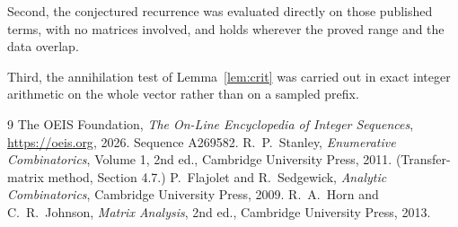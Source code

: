 \documentclass[11pt,a4paper]{article}
\theoremstyle{plain}
\theoremstyle{definition}
\begin{document}
Second, the conjectured recurrence was evaluated directly on those published terms, with no
matrices involved, and holds wherever the proved range and the data overlap.

Third, the annihilation test of Lemma~\ref{lem:crit} was carried out in exact integer
arithmetic on the whole vector rather than on a sampled prefix.

\begin{thebibliography}{9}
 The OEIS Foundation, \emph{The On-Line Encyclopedia of Integer
Sequences}, \url{https://oeis.org}, 2026. Sequence A269582.
 R.~P.~Stanley, \emph{Enumerative Combinatorics}, Volume 1, 2nd ed.,
Cambridge University Press, 2011. (Transfer-matrix method, Section 4.7.)
 P.~Flajolet and R.~Sedgewick, \emph{Analytic Combinatorics}, Cambridge
University Press, 2009.
 R.~A.~Horn and C.~R.~Johnson, \emph{Matrix Analysis}, 2nd ed., Cambridge
University Press, 2013.
\end{thebibliography}
\end{document}
